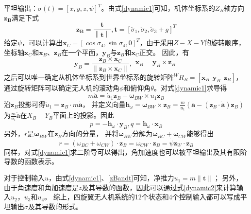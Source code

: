平坦输出：$\sigma(t) = \left[x,y,z,\psi \right]^T $。由式\ref{dynamic1}可知，机体坐标系的$Z_B$轴方向$\mathbf{z_B}$满足下式
\begin{equation}\label{zBandt}
    \mathbf{z_B}=\frac{\mathbf{t}}{\left\lVert\mathbf{t} \right\rVert },\mathbf{t}= \left[\ddot{\sigma}_1,\ddot{\sigma}_2,\ddot{\sigma}_3 +g  \right]^T
\end{equation}
给定$\psi$，可以计算出$\mathbf{x}_C = \left[\cos\sigma_4,\sin\sigma_4,0  \right]^T$，由于采用$Z-X-Y$的旋转顺序，
坐标轴\(\mathbf{x}_C\)和\(\mathbf{x}_B\)、\(\mathbf{z}_B\)在一个平面，$\mathbf{y}_B$与$\mathbf{z}_B$和$\mathbf{x}_C$正交。
因此，有
\begin{equation}\label{flatness1}
    \mathbf{y}_B=\frac{\mathbf{z}_B\times\mathbf{x}_C}{\|\mathbf{z}_B\times\mathbf{x}_C\|},\begin{array}{c}\mathbf{x}_B=\mathbf{y}_B\times\mathbf{z}_B\end{array}
\end{equation}
之后可以唯一确定从机体坐标系到世界坐标系的旋转矩阵\(^WR_B=\left[\mathbf{x}_B\ \ \mathbf{y}_B\ \ \mathbf{z}_B\right]\)，
通过旋转矩阵可以确定无人机的滚动角\(\phi \)和俯仰角$\theta$。对式\ref{dynamic1}求导得
\begin{equation}\label{equ-3-14}
    m\dot{\mathbf{a}}=\dot{u}_1\mathbf{z}_B+\boldsymbol{\omega}_{BW}\times u_1\mathbf{z}_B
\end{equation}
沿\(\mathbf{z}_B\)投影可得\(\dot{u}_1=\mathbf{z}_B\cdot m\dot{\mathbf{a}} \)，
并定义向量\(\mathbf{h}_\omega=\boldsymbol{\omega}_{BW}\times\mathbf{z}_B=\frac m{u_1}(\dot{\mathbf{a}}-(\mathbf{z}_B\cdot\dot{\mathbf{a}})\mathbf{z}_B)\)
为\(\frac m{u_1}\dot{\mathbf{a}}\)在\(X_B-Y_B\)平面上的投影。因此
\begin{equation}
   p=-\mathbf{h}_\omega\cdot\mathbf{y}_B,q=\mathbf{h}_\omega\cdot\mathbf{x}_B\label{equ-3-15}
\end{equation}
另外，\(r\)是\(\boldsymbol{\omega}_{BW}\)在\(\mathbf{z}_B\)方向的分量，
并将\(\boldsymbol{\omega}_{BW}\)分解为\(\boldsymbol{\omega}_{BC}+\boldsymbol{\omega}_{CW}\)能够得出
\begin{equation}\label{equ-3-16}
    r=(\omega_{BC}+\omega_{CW})\cdot\mathbf{z}_B=\omega_{CW}\cdot\mathbf{z}_B=\dot{\psi}\mathbf{z}_W\cdot\mathbf{z}_B
\end{equation}
同样，对式\ref{dynamic1}求二阶导可以得出，角加速度也可以被平坦输出及其有限阶导数的函数表示。

对于控制输入\(u\)，由式\ref{dynamic1}、\ref{zBandt}可知，净推力\(u_1=m\|\mathbf{t}\|\)；
另外，由于角速度和角加速度是\(z\)及其导数的函数，因此可以通过式\ref{dynamic2}来计算输入\(u_2\)，\(u_3\)和\(u_4\)。
综上，四旋翼无人机系统的12个状态和4个控制输入都可以写成平坦输出\(\sigma\)及其导数的形式。

